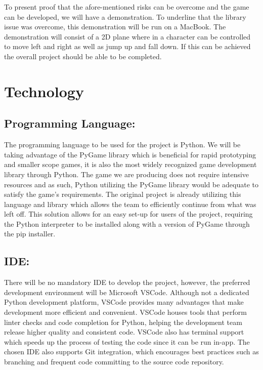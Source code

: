 \documentclass{article}
\begin{document}
To present proof that the afore-mentioned risks can be overcome and the game can
be developed, we will have a demonstration. To underline that the library issue
was overcome, this demonstration will be run on a MacBook. The demonstration
will consist of a 2D plane where in a character can be controlled to move left
and right as well as jump up and fall down. If this can be achieved the overall project should be able to be completed.

\section{Technology}
%

\subsection*{Programming Language:}

The programming language to be used for the project is Python. We will be taking
advantage of the PyGame library which is beneficial for rapid prototyping and
smaller scope games, it is also the most widely recognized game development
library through Python. The game we are producing does not require intensive
resources and as such, Python utilizing the PyGame library would be adequate to
satisfy the game’s requirements. The original project is already utilizing this
language and library which allows the team to efficiently continue from what was
left off. This solution allows for an easy set-up for users of the project,
requiring the Python interpreter to be installed along with a version of PyGame
through the pip installer.

\subsection*{IDE:}

There will be no mandatory IDE to develop the project, however, the preferred
development environment will be Microsoft VSCode. Although not a dedicated
Python development platform, VSCode provides many advantages that make
development more efficient and convenient. VSCode houses tools that perform
linter checks and code completion for Python, helping the development team
release higher quality and consistent code. VSCode also has terminal support
which speeds up the process of testing the code since it can be run in-app. The
chosen IDE also supports Git integration, which encourages best practices such
as branching and frequent code committing to the source code repository.
\end{document}
